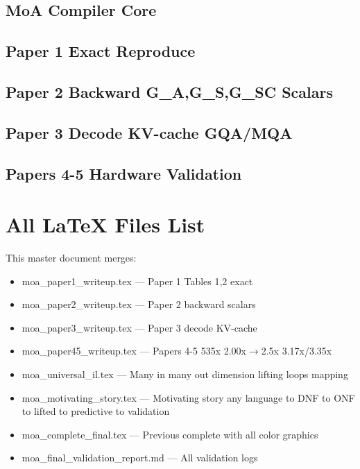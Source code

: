 \documentclass[12pt,a4paper]{article}
\begin{document}
\subsection{MoA Compiler Core}


\subsection{Paper 1 Exact Reproduce}


\subsection{Paper 2 Backward G\_A,G\_S,G\_SC Scalars}


\subsection{Paper 3 Decode KV-cache GQA/MQA}


\subsection{Papers 4-5 Hardware Validation}


\section{All LaTeX Files List}
This master document merges:
\begin{itemize}
\item moa\_paper1\_writeup.tex — Paper 1 Tables 1,2 exact
\item moa\_paper2\_writeup.tex — Paper 2 backward scalars
\item moa\_paper3\_writeup.tex — Paper 3 decode KV-cache
\item moa\_paper45\_writeup.tex — Papers 4-5 535x 2.00x$\rightarrow$2.5x 3.17x/3.35x
\item moa\_universal\_il.tex — Many in many out dimension lifting loops mapping
\item moa\_motivating\_story.tex — Motivating story any language to DNF to ONF to lifted to predictive to validation
\item moa\_complete\_final.tex — Previous complete with all color graphics
\item moa\_final\_validation\_report.md — All validation logs
\end{itemize}
\end{document}
